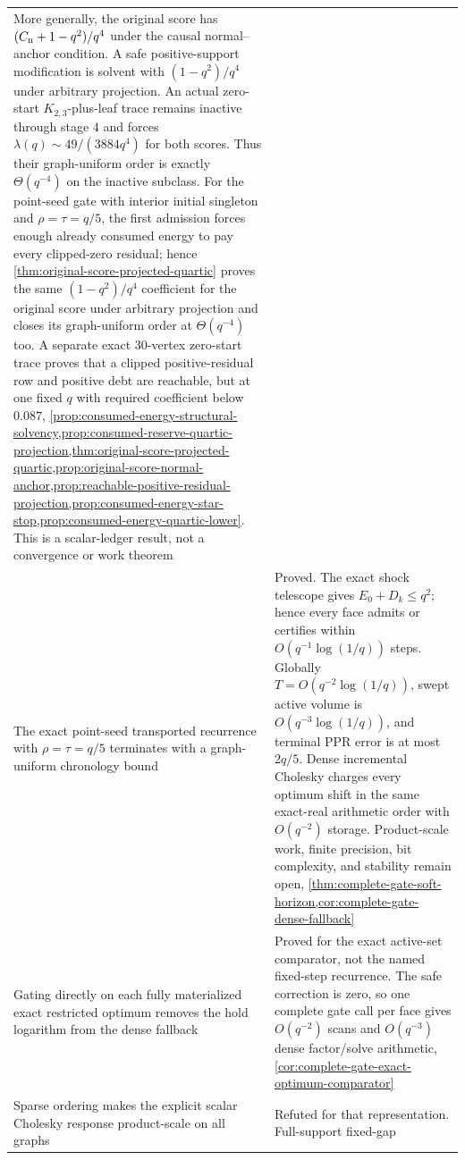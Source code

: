 \begin{center}
\begin{tabularx}{\textwidth}{@{}X p{}@{}}
More generally, the original score has
$(C_{\rm n}+1-q^2)/q^4$ under the causal normal--anchor condition.  A safe
positive-support modification is solvent with $(1-q^2)/q^4$ under arbitrary
projection.  An actual zero-start $K_{2,3}$-plus-leaf trace remains inactive
through stage $4$ and forces
$\lambda(q)\sim49/(3884q^4)$ for both scores.  Thus their graph-uniform order
is exactly $\Theta(q^{-4})$ on the inactive subclass.  For the point-seed
gate with interior initial singleton and $\rho=\tau=q/5$, the first admission
forces enough already consumed energy to pay every clipped-zero residual;
hence \cref{thm:original-score-projected-quartic} proves the same
$(1-q^2)/q^4$ coefficient for the original score under arbitrary projection
and closes its graph-uniform order at $\Theta(q^{-4})$ too.  A separate exact 30-vertex
zero-start trace proves that a clipped positive-residual row and positive
debt are reachable, but at one fixed $q$ with required coefficient below
$0.087$,
\cref{prop:consumed-energy-structural-solvency,prop:consumed-reserve-quartic-projection,thm:original-score-projected-quartic,prop:original-score-normal-anchor,prop:reachable-positive-residual-projection,prop:consumed-energy-star-stop,prop:consumed-energy-quartic-lower}.
This is a scalar-ledger result, not a convergence or work theorem \\
The exact point-seed transported recurrence with $\rho=\tau=q/5$ terminates
with a graph-uniform chronology bound & Proved.  The exact shock telescope
gives $E_0+D_k\leq q^2$; hence every face admits or certifies within
$O(q^{-1}\log(1/q))$ steps.  Globally
$T=O(q^{-2}\log(1/q))$, swept active volume is
$O(q^{-3}\log(1/q))$, and terminal PPR error is at most $2q/5$.  Dense
incremental Cholesky charges every optimum shift in the same exact-real
arithmetic order with $O(q^{-2})$ storage.  Product-scale work, finite
precision, bit complexity, and stability remain open,
\cref{thm:complete-gate-soft-horizon,cor:complete-gate-dense-fallback} \\
Gating directly on each fully materialized exact restricted optimum removes
the hold logarithm from the dense fallback & Proved for the exact active-set
comparator, not the named fixed-step recurrence.  The safe correction is zero,
so one complete gate call per face gives $O(q^{-2})$ scans and
$O(q^{-3})$ dense factor/solve arithmetic,
\cref{cor:complete-gate-exact-optimum-comparator} \\
Sparse ordering makes the explicit scalar Cholesky response product-scale on
all graphs & Refuted for that representation.  Full-support fixed-gap

\end{tabularx}
\end{center}
